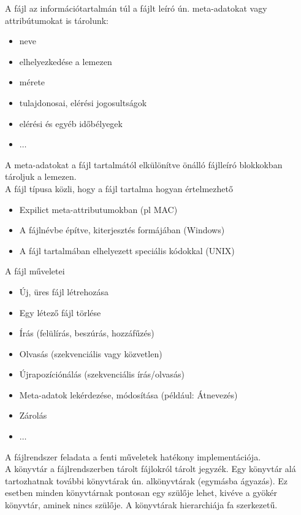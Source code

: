 \documentclass[tikz,12pt,margin=0px]{article}
\begin{document}
    \noindent A fájl az információtartalmán túl a fájlt leíró ún. meta-adatokat vagy attribútumokat is tárolunk:
    \begin{itemize}[topsep=8pt,itemsep=4pt,partopsep=4pt, parsep=4pt]
      \item neve
      \item elhelyezkedése a lemezen
      \item mérete
      \item tulajdonosai, elérési jogosultságok
      \item elérési és egyéb időbélyegek
      \item $\ldots$
    \end{itemize}

    \noindent A meta-adatokat a fájl tartalmától elkülönítve önálló fájlleíró blokkokban tároljuk a lemezen.\\

    \noindent A fájl típusa közli, hogy a fájl tartalma hogyan értelmezhető
    \begin{itemize}
      \item Expilict meta-attributumokban (pl MAC)
      \item A fájlnévbe építve, kiterjesztés formájában (Windows)
      \item A fájl tartalmában elhelyezett speciális kódokkal (UNIX)
    \end{itemize}

    \noindent A fájl műveletei
    \begin{itemize}[topsep=8pt,itemsep=4pt,partopsep=4pt, parsep=4pt]
        \item Új, üres fájl létrehozása
        \item Egy létező fájl törlése
        \item Írás (felülírás, beszúrás, hozzáfűzés)
        \item Olvasás (szekvenciális vagy közvetlen)
        \item Újrapozíciónálás (szekvenciális írás/olvasás)
        \item Meta-adatok lekérdezése, módosítása (például: Átnevezés)
        \item Zárolás
        \item $\ldots$
    \end{itemize}

    \noindent A fájlrendszer feladata a fenti műveletek hatékony implementációja.\\

    \noindent A könyvtár a fájlrendszerben tárolt fájlokról tárolt jegyzék. Egy könyvtár alá tartozhatnak további könyvtárak ún. alkönyvtárak (egymásba ágyazás). Ez esetben minden könyvtárnak pontosan egy szülője lehet, kivéve a gyökér könyvtár, aminek nincs szülője. A könyvtárak hierarchiája fa szerkezetű.\\
\end{document}
